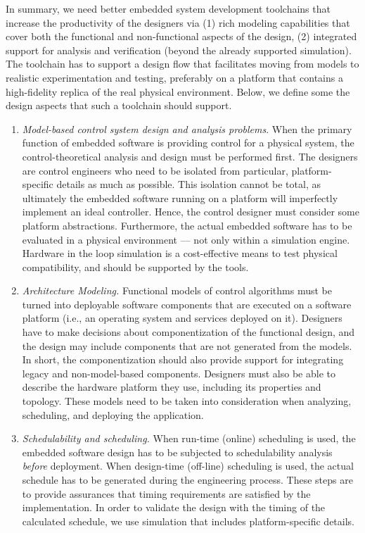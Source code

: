 In summary, we need better embedded system development toolchains that increase the productivity of the designers via (1) rich modeling capabilities that cover both the functional and non-functional aspects of the design, (2) integrated support for analysis and verification (beyond the already supported simulation). The toolchain has to support a design flow that facilitates moving from models to realistic experimentation and testing, preferably on a platform that contains a high-fidelity replica of the real physical environment. Below, we define some the design aspects that such a toolchain should support.

\begin{enumerate}
    \item \emph{Model-based control system design and analysis problems}. 
When the primary function of embedded software is providing control for a physical system, the control-theoretical analysis and design must be performed first. The designers are control engineers who need to be isolated from particular, platform-specific details as much as possible. This isolation cannot be total, as ultimately the embedded software running on a platform will imperfectly implement an ideal controller. Hence, the control designer must consider some platform abstractions. Furthermore, the actual embedded software has to be evaluated in a physical environment --- not only within a simulation engine. Hardware in the loop simulation is a cost-effective means to test physical compatibility, and should be supported by the tools. 
    \item \emph{Architecture Modeling.}
Functional models of control algorithms must be turned into deployable software components that are executed on a software platform (i.e., an operating system and services deployed on it). Designers have to make decisions about componentization of the functional design, and the design may include components that are not generated from the models. In short, the componentization should also provide support for integrating legacy and non-model-based components. Designers must also be able to describe the hardware platform they use, including its properties and topology. These models need to be taken into consideration when analyzing, scheduling, and deploying the application.
    \item \emph{Schedulability and scheduling.}
When run-time (online) scheduling is used, the embedded software design has to be subjected to schedulability analysis \emph{before} deployment. When design-time (off-line) scheduling is used, the actual schedule has to be generated during the engineering process. These steps are to provide assurances that timing requirements are satisfied by the implementation. In order to validate the design with the timing of the calculated schedule, we use simulation that includes platform-specific details.

\end{enumerate}
